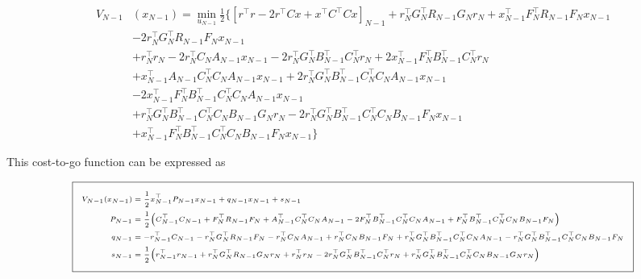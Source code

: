 \documentclass[11pt,letterpaper,onecolumn,notitlepage]{article}
\begin{document}
  \begin{equation*}
    \begin{split}
      V_{N-1}&(x_{N-1})=\min_{u_{N-1}}\frac{1}{2}\biggr\{
      \left[r^{\top}r-2r^{\top}Cx+x^{\top}C^{\top}Cx\right]_{N-1}
      +r_{N}^{\top}G_{N}^{\top}R_{N-1}G_{N}r_{N}
      +x_{N-1}^{\top}F_{N}^{\top}R_{N-1}F_{N}x_{N-1} \\
      &-2r_{N}^{\top}G_{N}^{\top}R_{N-1}F_{N}x_{N-1} \\
      &+r_{N}^{\top}r_{N}
      -2r_{N}^{\top}C_{N}A_{N-1}x_{N-1}
      -2r_{N}^{\top}G_{N}^{\top}B_{N-1}^{\top}C_{N}^{\top}r_{N}
      +2x_{N-1}^{\top}F_{N}^{\top}B_{N-1}^{\top}C_{N}^{\top}r_{N} \\
      &+x_{N-1}^{\top}A_{N-1}C_{N}^{\top}C_{N}A_{N-1}x_{N-1}
      +2r_{N}^{\top}G_{N}^{\top}B_{N-1}^{\top}C_{N}^{\top}C_{N}A_{N-1}x_{N-1} \\
      &-2x_{N-1}^{\top}F_{N}^{\top}B_{N-1}^{\top}C_{N}^{\top}C_{N}A_{N-1}x_{N-1} \\
      &+r_{N}^{\top}G_{N}^{\top}B_{N-1}^{\top}C_{N}^{\top}C_{N}B_{N-1}G_{N}r_{N}
      -2r_{N}^{\top}G_{N}^{\top}B_{N-1}^{\top}C_{N}^{\top}C_{N}B_{N-1}F_{N}x_{N-1} \\
      &+x_{N-1}^{\top}F_{N}^{\top}B_{N-1}^{\top}C_{N}^{\top}C_{N}B_{N-1}F_{N}x_{N-1}
      \biggr\}
    \end{split}
  \end{equation*}

  This cost-to-go function can be expressed as

  \begin{equation*}
    \fontsize{6pt}{1pt}\selectfont
    \addtolength{\fboxsep}{5pt}
    \boxed{%
      \begin{split}
        V_{N-1}(x_{N-1})&=\frac{1}{2}x_{N-1}^{\top}P_{N-1}x_{N-1}+q_{N-1}x_{N-1}+s_{N-1} \\
        P_{N-1}&=\frac{1}{2}\bigr(C_{N-1}^{\top}C_{N-1}+F_{N}^{\top}R_{N-1}F_{N}+A_{N-1}^{\top}C_{N}^{\top}C_{N}A_{N-1}-2F_{N}^{\top}B_{N-1}^{\top}C_{N}^{\top}C_{N}A_{N-1}+F_{N}^{\top}B_{N-1}^{\top}C_{N}^{\top}C_{N}B_{N-1}F_{N}\bigr) \\
        q_{N-1}&=-r_{N-1}^{\top}C_{N-1}-r_{N}^{\top}G_{N}^{\top}R_{N-1}F_{N}-r_{N}^{\top}C_{N}A_{N-1}+r_{N}^{\top}C_{N}B_{N-1}F_{N}+r_{N}^{\top}G_{N}^{\top}B_{N-1}^{\top}C_{N}^{\top}C_{N}A_{N-1}-r_{N}^{\top}G_{N}^{\top}B_{N-1}^{\top}C_{N}^{\top}C_{N}B_{N-1}F_{N} \\
        s_{N-1}&=\frac{1}{2}\bigr(r_{N-1}^{\top}r_{N-1}+r_{N}^{\top}G_{N}^{\top}R_{N-1}G_{N}r_{N}+r_{N}^{\top}r_{N}-2r_{N}^{\top}G_{N}^{\top}B_{N-1}^{\top}C_{N}^{\top}r_{N}+r_{N}^{\top}G_{N}^{\top}B_{N-1}^{\top}C_{N}^{\top}C_{N}B_{N-1}G_{N}r_{N}\bigr)
      \end{split}
    }
  \end{equation*}
\end{document}
